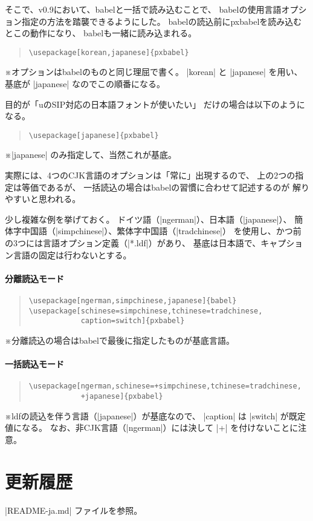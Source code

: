 \documentclass[a4paper,uplatex]{jsarticle}
\newcommand{\Pkg}[1]{\textsf{#1}}
\newcommand{\Note}{\par\noindent ※}
\providecommand{\upTeX}{u\pTeX}
\begin{document}
そこで、v0.9において、\Pkg{babel}と一括で読み込むことで、
\Pkg{babel}の使用言語オプション指定の方法を踏襲できるようにした。
\Pkg{babel}の読込前に\Pkg{pxbabel}を読み込むとこの動作になり、
\Pkg{babel}も一緒に読み込まれる。

\begin{quote}\begin{verbatim}
\usepackage[korean,japanese]{pxbabel}
\end{verbatim}\end{quote}
\Note オプションは\Pkg{babel}のものと同じ理屈で書く。
|korean| と |japanese| を用い、
基底が |japanese| なのでこの順番になる。

目的が「{\upTeX}のSIP対応の日本語フォントが使いたい」
だけの場合は以下のようになる。

\begin{quote}\begin{verbatim}
\usepackage[japanese]{pxbabel}
\end{verbatim}\end{quote}
\Note |japanese| のみ指定して、当然これが基底。

実際には、4つのCJK言語のオプションは「常に」出現するので、
上の2つの指定は等価であるが、
一括読込の場合は\Pkg{babel}の習慣に合わせて記述するのが
解りやすいと思われる。

少し複雑な例を挙げておく。
ドイツ語（|ngerman|）、日本語（|japanese|）、
簡体字中国語（|simpchinese|）、繁体字中国語（|tradchinese|）
を使用し、かつ前の3つには言語オプション定義（|*.ldf|）があり、
基底は日本語で、キャプション言語の固定は行わないとする。

\paragraph{分離読込モード}

\begin{quote}\begin{verbatim}
\usepackage[ngerman,simpchinese,japanese]{babel}
\usepackage[schinese=simpchinese,tchinese=tradchinese,
            caption=switch]{pxbabel}
\end{verbatim}\end{quote}

\Note 分離読込の場合は\Pkg{babel}で最後に指定したものが基底言語。

\paragraph{一括読込モード}
\begin{quote}\begin{verbatim}
\usepackage[ngerman,schinese=+simpchinese,tchinese=tradchinese,
            +japanese]{pxbabel}
\end{verbatim}\end{quote}

\Note ldfの読込を伴う言語（|japanese|）が基底なので、
|caption| は |switch| が既定値になる。
なお、非CJK言語（|ngerman|）には決して |+| を付けないことに注意。

\section{更新履歴}

|README-ja.md| ファイルを参照。

\end{document}
